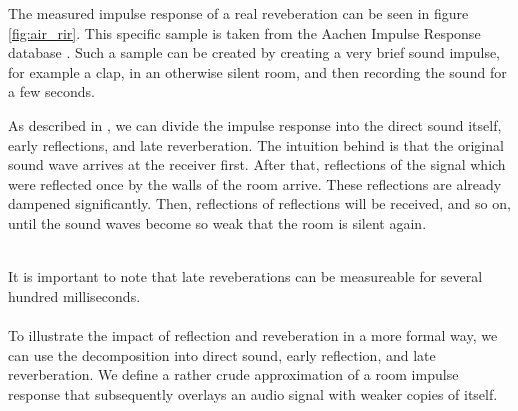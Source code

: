 The measured impulse response of a real reveberation can be seen in figure \ref{fig:air_rir}. This specific sample is taken from the Aachen Impulse Response database \cite{jeub2009binaural}. Such a sample can be created by creating a very brief sound impulse, for example a clap, in an otherwise silent room, and then recording the sound for a few seconds. 

As described in \cite{yoshioka2012making}, we can divide the impulse response into the direct sound itself, early reflections, and late reverberation. The intuition behind is that the original sound wave arrives at the receiver first. After that, reflections of the signal which were reflected once by the walls of the room arrive. These reflections are already dampened significantly. Then, reflections of reflections will be received, and so on, until the sound waves become so weak that the room is silent again. 
\\ \\
\begin{minipage}{\linewidth}
\end{minipage}

It is important to note that late reveberations can be measureable for several hundred milliseconds.\\\\

To illustrate the impact of reflection and reveberation in a more formal way, we can use the decomposition into direct sound, early reflection, and late reverberation. We define a rather crude approximation of a room impulse response that subsequently overlays an audio signal with weaker copies of itself.

